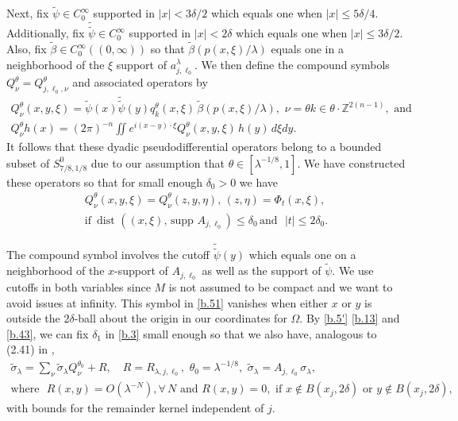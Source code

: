 \documentclass[10pt]{amsart}
\newcommand{\la}{\lambda}
\newcommand{\1}{{\bf 1}}
\begin{document}
Next, fix $\tilde \psi\in C^\infty_0$ supported in $|x|<3\delta/2$ which equals one when
$|x|\le 5\delta/4$.  Additionally, fix $\tilde{\tilde \psi} \in C^\infty_0$ supported in 
$|x|<2\delta$ which equals one when $|x|\le 3\delta/2$.
Also, fix 
$\tilde \beta \in C^\infty_0((0,\infty))$ so that $\tilde \beta(p(x,\xi)/\la)$ equals one in a neighborhood
of the $\xi$ support of $a^\la_{j,\ell_0}$.  We then define the compound symbols $Q^\theta_\nu
=Q^\theta_{j,\ell_0,\nu}$ and associated operators by
\begin{multline}\label{b.50}
Q^\theta_\nu(x,y,\xi)=\tilde \psi(x) \tilde{\tilde \psi}(y) q^\theta_k(x,\xi) \, 
\tilde \beta(p(x,\xi)/\la), \, \,
\nu=\theta k\in \theta\cdot {\mathbb Z}^{2(n-1)}, \, \, \text{and}
\\
Q^\theta_\nu h(x) = (2\pi)^{-n}
\iint e^{i(x-y)\cdot \xi}   Q^\theta_\nu(x,y,\xi)\,  h(y) \, d\xi dy.
\end{multline}
It follows that these dyadic pseudodifferential operators belong to a bounded subset
of $S^0_{7/8,1/8}$ due to our assumption that $\theta\in [\la^{-1/8},1]$.  We have constructed these
operators so that for small enough $\delta_0>0$ we have
\begin{multline}\label{b.51}
Q^\theta_\nu(x,y,\xi)=Q^\theta_\nu(z,y,\eta), \, (z,\eta)=\Phi_t(x,\xi), 
\\ \text{if } \, \text{dist }((x,\xi), \, \text{supp }A_{j,\ell_0})\le \delta_0
\, \text{and } \, \, |t|\le 2\delta_0.
%
\end{multline}


The compound symbol involves the cutoff $\tilde{\tilde \psi}(y)$ which equals one on a neighborhood 
of the $x$-support of $A_{j,\ell_0}$ as well as the support of $\tilde \psi$.
We use cutoffs in both variables
since $M$ is not assumed to be compact and we want to avoid
issues at infinity.   This symbol in \eqref{b.51} vanishes when either $x$ or $y$ is outside the $2\delta$-ball about
the origin in our coordinates for $\Omega$.  By \eqref{b.5'} \eqref{b.13} and \eqref{b.43}, we can fix $\delta_1$ in \eqref{b.3} small enough so that
we also have, analogous to (2.41) in \cite{HSp},
\begin{multline}\label{b.52}
\tilde \sigma_\la = \sum_\nu \tilde \sigma_\la Q^{\theta_0}_\nu + R, \quad R=R_{\la,j,\ell_0},  \, \, \theta_0=\la^{-1/8},
\, \,  \tilde \sigma_\la =A_{j,\ell_0}\sigma_\la, 
\\
\text{where } \, \, R(x,y)=O(\la^{-N}), \forall \, N \, \, 
\text{and } R(x,y)=0, \, \, \text{if } x\notin B(x_j,2\delta) \, \,
\text{or } y\notin B(x_j,2\delta),
\end{multline}
with bounds for the remainder kernel independent of $j$.
\end{document}
